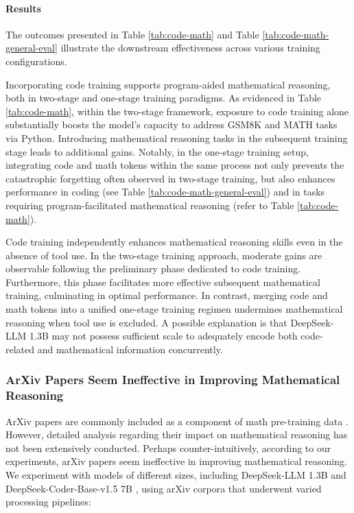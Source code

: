 \begin{itemize}[topsep=0pt]
\begin{itemize}[topsep=0pt]
\paragraph{Results}
The outcomes presented in Table \ref{tab:code-math} and Table \ref{tab:code-math-general-eval} illustrate the downstream effectiveness across various training configurations.

Incorporating code training supports program-aided mathematical reasoning, both in two-stage and one-stage training paradigms. As evidenced in Table \ref{tab:code-math}, within the two-stage framework, exposure to code training alone substantially boosts the model’s capacity to address GSM8K and MATH tasks via Python. Introducing mathematical reasoning tasks in the subsequent training stage leads to additional gains. Notably, in the one-stage training setup, integrating code and math tokens within the same process not only prevents the catastrophic forgetting often observed in two-stage training, but also enhances performance in coding (see Table \ref{tab:code-math-general-eval}) and in tasks requiring program-facilitated mathematical reasoning (refer to Table \ref{tab:code-math}).

Code training independently enhances mathematical reasoning skills even in the absence of tool use. In the two-stage training approach, moderate gains are observable following the preliminary phase dedicated to code training. Furthermore, this phase facilitates more effective subsequent mathematical training, culminating in optimal performance. In contrast, merging code and math tokens into a unified one-stage training regimen undermines mathematical reasoning when tool use is excluded. A possible explanation is that DeepSeek-LLM 1.3B may not possess sufficient scale to adequately encode both code-related and mathematical information concurrently.

\subsubsection{ArXiv Papers Seem Ineffective in Improving Mathematical Reasoning}

ArXiv papers are commonly included as a component of math pre-training data \citep{minerva,gpt-f,llemma,mathpile}. However, detailed analysis regarding their impact on mathematical reasoning has not been extensively conducted. Perhaps counter-intuitively, according to our experiments, arXiv papers seem ineffective in improving mathematical reasoning. We experiment with models of different sizes, including DeepSeek-LLM 1.3B and DeepSeek-Coder-Base-v1.5 7B \citep{deepseek-coder}, using arXiv corpora that underwent varied processing pipelines:


\end{itemize}
\end{itemize}
